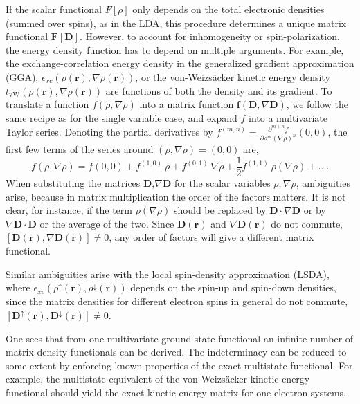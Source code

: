 \documentclass[journal=jpclcd,manuscript=letter]{achemso}
\newcommand\m[1]{\mathbf{#1}}
\renewcommand\vec[1]{\mathbf{#1}}
\begin{document}
If the scalar functional $F[\rho]$ only depends on the total electronic densities (summed over spins), as in the LDA,
this procedure determines a unique matrix functional $\m{F}[\m{D}]$.
However, to account for inhomogeneity or spin-polarization,
the energy density function has to depend on multiple arguments. For example, the exchange-correlation energy density in
the generalized gradient approximation (GGA), $\epsilon_{xc}(\rho(\vec{r}),\nabla \rho(\vec{r}))$, 
or the von-Weizs\"{a}cker kinetic energy density $t_{\text{vW}}(\rho(\vec{r}),\nabla \rho(\vec{r}))$ are functions of both the density and its gradient.
To translate a function $f(\rho,\nabla \rho)$ into a matrix function $\m{f}(\m{D},\nabla \m{D})$,
we follow the same recipe as for the single variable case, and expand $f$ into a multivariate Taylor series.
Denoting the partial derivatives by $f^{(m,n)} = \frac{\partial^{m+n} f}{\partial \rho^{m} (\nabla \rho)^{n}}(0,0)$, the first few terms
of the series around $(\rho,\nabla \rho) = (0,0)$ are,
\begin{equation}
 f(\rho,\nabla \rho) = f(0,0) + f^{(1,0)}~\rho + f^{(0,1)} ~ \nabla \rho + \frac{1}{2} f^{(1,1)} ~ \rho(\nabla \rho) + \ldots.
\end{equation}
When substituting the matrices $\m{D}$,$\nabla \m{D}$ for the scalar variables $\rho,\nabla \rho$, ambiguities arise,
because in matrix multiplication the order of the factors matters. It is not clear, for instance,
if the term $\rho (\nabla \rho)$
should be replaced by $\m{D} \cdot \nabla  \m{D}$ or by $\nabla \m{D} \cdot \m{D}$
or the average of the two. Since $\m{D}(\vec{r})$ and $\nabla \m{D}(\vec{r})$ do not commute,
$[\m{D}(\vec{r}),\nabla \m{D}(\vec{r})] \neq 0$, any order of factors will give
a different matrix functional.

Similar ambiguities arise with the local spin-density approximation (LSDA),
where $\epsilon_{xc}(\rho^{\uparrow}(\vec{r}), \rho^{\downarrow}(\vec{r}))$
depends on the spin-up and spin-down densities, since the matrix densities for different electron spins
in general do not commute, $[\m{D}^{\uparrow}(\vec{r}), \m{D}^{\downarrow}(\vec{r})] \neq 0$.

One sees that from one multivariate ground state functional an infinite number of matrix-density functionals can be derived.
The indeterminacy can be reduced to some extent by enforcing known properties of the exact multistate functional.
For example, the multistate-equivalent of the von-Weizs\"{a}cker kinetic energy functional should yield the
exact kinetic energy matrix for one-electron systems.
\end{document}
